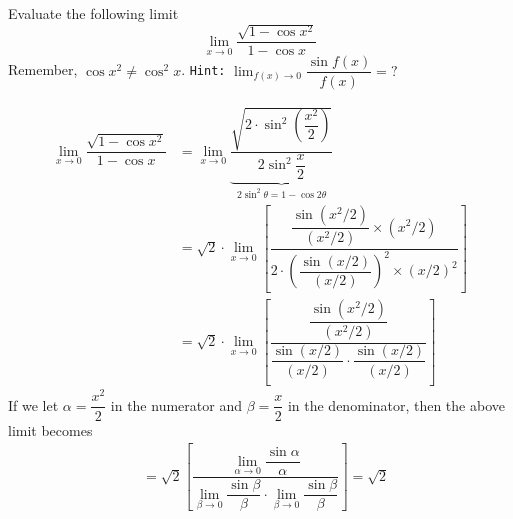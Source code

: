 



\question[5] Evaluate the following limit \[ \lim_{x\to 0}\dfrac{\sqrt{1-\cos x^2}}{1-\cos x}\]
Remember, $\cos x^2\neq\cos^2 x$. \texttt{Hint:} $\lim_{f(x)\to 0}\dfrac{\sin f(x)}{f(x)} = ?$

\ifprintanswers
\fi

\begin{solution}[\halfpage]
  \begin{align}
    \lim_{x\to 0}\dfrac{\sqrt{1-\cos x^2}}{1-\cos x} &=
    \lim_{x\to 0}\underbrace{\dfrac{\sqrt{2\cdot\sin^2\left(\dfrac{x^2}{2}\right)}}{2\sin^2\dfrac{x}{2}}}_{2\sin^2\theta = 1-\cos 2\theta} \\
    &= \sqrt{2}\cdot\lim_{x\to 0}\left[\dfrac
    {\dfrac{\sin (x^2/2)}{(x^2/2)}\times (x^2/2)}
    {2\cdot\left(\dfrac{\sin (x/2)}{(x/2)}\right)^2
    \times\left( x/2 \right)^2}\right] \\
    &= \sqrt{2}\cdot\lim_{x\to 0}\left[\dfrac
    {\dfrac{\sin (x^2/2)}{(x^2/2)}}
    {\dfrac{\sin (x/2)}{(x/2)}\cdot\dfrac{\sin (x/2)}{(x/2)}}\right]
  \end{align}
  If we let $\alpha = \dfrac{x^2}{2}$ in the numerator and $\beta = \dfrac{x}{2}$
  in the denominator, then the above limit becomes 
  \begin{align}
    &= \sqrt{2}\left[\dfrac{\lim_{\alpha\to 0}\dfrac{\sin\alpha}{\alpha}}
    {\lim_{\beta\to 0}\dfrac{\sin\beta}{\beta}\cdot\lim_{\beta\to 0}\dfrac{\sin\beta}{\beta}}\right] = \sqrt{2}
  \end{align}
\end{solution}

